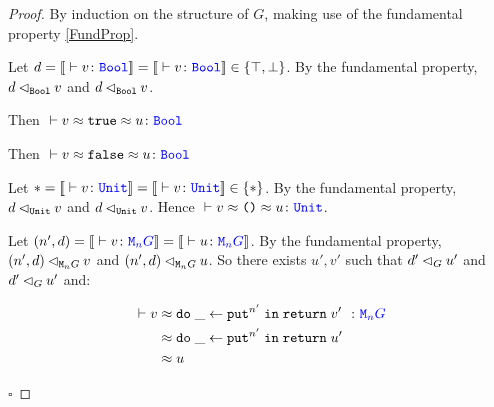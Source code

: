 \documentclass{Report}
\begin{document}
\begin{proof}
    By induction on the structure of $G$, making use of the fundamental property \ref{FundProp}.

    Let $d=\deno{\ztyperelation{v}{\B}}=\deno{\ztyperelation{v}{\B}}\in \{\top, \bot\}$. By the fundamental property, $d \lhd_{\texttt{Bool}} v$  and $d \lhd_{\texttt{Bool}} v$.

    Then $\zberelation{v\beequiv\t}{u}{\B}$

    
    Then $\zberelation{v\beequiv\f}{u}{\B}$

    Let $\singleton=\deno{\ztyperelation{v}{\U}}=\deno{\ztyperelation{v}{\U}}\in \{\singleton\}$. By the fundamental property, $d \lhd_{\texttt{Unit}} v$  and $d \lhd_{\texttt{Unit}} v$. Hence $\zberelation{v\beequiv\u}{u}{\U}$.


    Let $(n', d) = \deno{\ztyperelation{v}{\M{n}{G}}} = \deno{\ztyperelation{u}{\M{n}{G}}}$. By the fundamental property, $(n', d) \lhd_{\texttt{M}_{n}{G}} v$ and $(n', d) \lhd_{\texttt{M}_{n}{G}} u$. So there exists $u', v'$ such that $d' \lhd_{G} u'$ and $d' \lhd_{G} u'$ and:

    \begin{align}
        \zberelation{v&}{\doin{\_}{\put^{n'}}{\return{v'}}}{\M{n}{G}}\\
        &\beequiv \doin{\_}{\put^{n'}}{\return{u'}}\\
        & \beequiv u
    \end{align}

$\square$
\end{proof}
\end{document}
